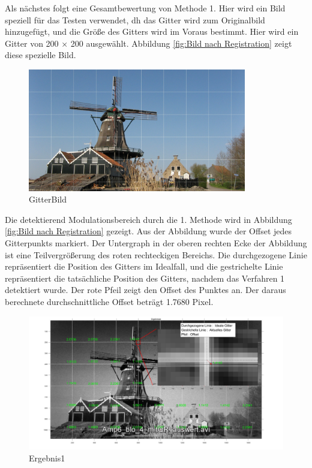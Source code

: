 Als nächstes folgt eine Gesamtbewertung von Methode 1. Hier wird ein Bild speziell für das Testen verwendet, dh das Gitter wird zum Originalbild hinzugefügt, und die Größe des Gitters wird im Voraus bestimmt. Hier wird ein Gitter von 200 × 200 ausgewählt. Abbildung \ref{fig:Bild nach Registration} zeigt diese spezielle Bild.
\begin{figure}[H]
 \centering 
  \includegraphics[keepaspectratio,width=0.85\textwidth]{images/6_Auswertung/windmill_auswert.pdf}
 \caption{GitterBild}
 \label{fig:GitterBild}
\end{figure}

Die detektierend Modulationsbereich durch die 1. Methode wird in Abbildung \ref{fig:Bild nach Registration} gezeigt. Aus der Abbildung wurde der Offset jedes Gitterpunkts markiert. Der Untergraph in der oberen rechten Ecke der Abbildung ist eine Teilvergrößerung des roten rechteckigen Bereichs. Die durchgezogene Linie repräsentiert die Position des Gitters im Idealfall, und die gestrichelte Linie repräsentiert die tatsächliche Position des Gitters, nachdem das Verfahren 1 detektiert wurde. Der rote Pfeil zeigt den Offset des Punktes an. Der daraus berechnete durchschnittliche Offset beträgt 1.7680 Pixel. 

\begin{figure}[H]
 \centering 
  \includegraphics[keepaspectratio,width=1.00\textwidth]{images/6_Auswertung/Ergebnis1.pdf}
 \caption{Ergebnis1}
 \label{fig:Ergebnis1}
\end{figure}


